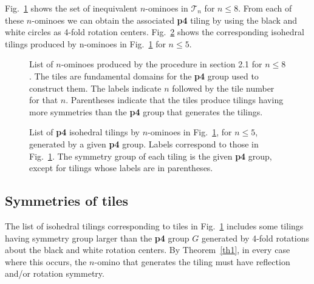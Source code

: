 \documentclass{ws-ijcga}
\begin{document}
Fig.~\ref{p4fighi} shows the set of inequivalent $n$-ominoes in $\mathscr{T}_n$
for $n \le 8$. 
From each of these $n$-ominoes
we can obtain the associated {\bf p4} tiling by using the black and white circles as 4-fold rotation
centers. 
Fig.~\ref{p4tiling} shows the corresponding isohedral tilings produced by n-ominoes in Fig.~\ref{p4fighi} for $n \le 5$.
\begin{figure}[h]
\centerline{}
\caption{
List of $n$-ominoes produced by the procedure in section 2.1 for $n \le 8$. 
The tiles are fundamental domains for
the {\bf p4} group used to construct them. 
The labels indicate $n$ followed by the tile number for that $n$. Parentheses
indicate that the tiles produce tilings having more symmetries than the {\bf p4} group that generates the tilings.
\label{p4fighi}
}
\end{figure}
\begin{figure}[h]
\centerline{}
\caption{
List of {\bf p4} isohedral tilings by $n$-ominoes in Fig.~\ref{p4fighi}, for $n \le 5$, 
generated by a given {\bf p4} group. Labels
correspond to those in Fig.~\ref{p4fighi}. 
The symmetry group of each tiling is the given {\bf p4} group, 
except for tilings whose labels are in parentheses.
\label{p4tiling}
}
\end{figure}


\subsection{Symmetries of tiles}
The list of isohedral tilings corresponding to tiles in Fig.~\ref{p4fighi} includes some tilings having
symmetry group larger than the {\bf p4} group $G$ generated by 4-fold rotations about the black
and white rotation centers. By Theorem~\ref{th1}, in every case where this occurs, the $n$-omino
that generates the tiling must have reflection and/or rotation symmetry.
\end{document}
